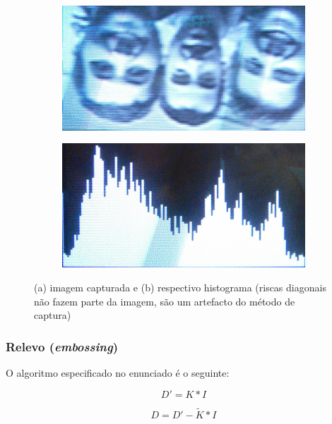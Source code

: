 \documentclass[a4paper,12pt]{article}
\begin{document}
\begin{figure}[h]
	\centering
	\begin{subfigure}[b]{0.40\textwidth}
		\centering
		\includegraphics[width=\linewidth]{imagens/hist_capturada.png}
		\caption{}
	\end{subfigure}
	\begin{subfigure}[b]{0.40\textwidth}
		\centering
		\includegraphics[width=\linewidth]{imagens/hist_resultado.png}
		\caption{}
	\end{subfigure}
	\caption{(a) imagem capturada e (b) respectivo histograma (riscas diagonais não fazem parte da imagem, são um artefacto do método de captura)}
	\label{fig:histograma}
\end{figure}


\subsubsection{Relevo (\textit{embossing})}
\label{subsec:relevo}

O algoritmo especificado no enunciado é o seguinte:

\[
D' = K \ast I
\]

\[
D = D' - \widetilde{K} \ast I
\]
\end{document}
